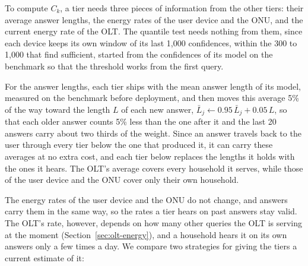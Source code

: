 \documentclass[cic,dipl,english]{infufrgs}
\begin{document}
To compute $C_k$, a tier needs three pieces of information from the other tiers: their average answer
lengths, the energy rates of the user device and the ONU, and the current energy rate of
the OLT. The quantile test needs nothing from them, since each device keeps its own window
of its last 1,000 confidences, within the 300 to 1,000 that 
find sufficient, started from the confidences of its model on the benchmark so that the
threshold works from the first query.

For the answer lengths, each tier ships with the mean answer length of its model, measured
on the benchmark before deployment, and then moves this average 5\% of the way toward the
length $L$ of each new answer, $\bar{L}_j \leftarrow 0.95\,\bar{L}_j + 0.05\,L$, so that each
older answer counts 5\% less than the one after it and the last 20 answers carry about two
thirds of the weight. Since an answer travels back to the user through every tier below the
one that produced it, it can carry these averages at no extra cost, and each tier below
replaces the lengths it holds with the ones it hears. The OLT's average covers every
household it serves, while those of the user device and the ONU cover only their own
household.

The energy rates of the user device and the ONU do not change, and answers carry them in
the same way, so the rates a tier hears on past answers stay valid. The OLT's rate, however,
depends on how many other queries the OLT is serving at the moment
(Section~\ref{sec:olt-energy}), and a household hears it on its own answers only a few
times a day. We compare two strategies for giving the tiers a current estimate of it:
\end{document}

